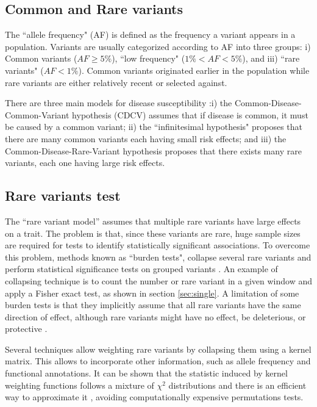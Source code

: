 \subsection{Common and Rare variants}

The ``allele frequency" (AF) is defined as the frequency a variant appears in a population. Variants are usually categorized according to AF into three groups: i) Common variants ($AF \geq 5\%$), ``low frequency" ($1\% < AF < 5\%$), and iii) ``rare variants" ($AF < 1\%$). Common variants originated earlier in the population while rare variants are either relatively recent or selected against.

There are three main models for disease susceptibility  \cite{hartl1997principles, gibson2012rare}:i) the Common-Disease-Common-Variant hypothesis (CDCV) assumes that if disease is common, it must be caused by a common variant; ii) the ``infinitesimal hypothesis" proposes that there are many common variants each having small risk effects; and iii) the Common-Disease-Rare-Variant hypothesis proposes that there exists many rare variants, each one having large risk effects.

\subsection{Rare variants test}

The ``rare variant model'' assumes that multiple rare variants have large effects on a trait. The problem is that, since these variants are rare, huge sample sizes are required for tests to identify statistically significant associations. To overcome this problem, methods known as ``burden tests", collapse several rare variants and perform statistical significance tests on grouped variants \cite{li2008methods}. An example of collapsing technique is to count the number or rare variant in a given window and apply a Fisher exact test, as shown in section \ref{sec:single}. A limitation of some burden tests is that they implicitly assume that all rare variants have the same direction of effect, although rare variants might have no effect, be deleterious, or protective \cite{li2008methods,wu2011rare}.

Several techniques allow weighting rare variants by collapsing them using a kernel matrix. This allows to incorporate other information, such as allele frequency and functional annotations. It can be shown that the statistic induced by kernel weighting functions follows a mixture of $\chi^2$ distributions and there is an efficient way to approximate it \cite{li2008methods,wu2011rare}, avoiding computationally expensive permutations tests.

